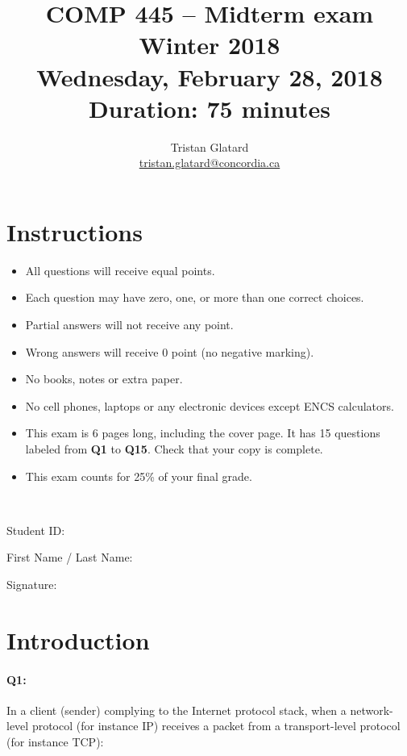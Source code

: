 \documentclass{llncs}
\title{COMP 445 -- Midterm exam \\ Winter 2018 \\ Wednesday, February 28, 2018\\ Duration: 75 minutes}
\author{Tristan Glatard\\
  \href{mailto:tristan.glatard@concordia.ca}{tristan.glatard@concordia.ca}
}
\institute{Concordia University\\
  Department of Computer Science and Software Engineering}
\newcommand{\myspace}[0]{\vspace*{0.25cm}}
\begin{document}
\maketitle

\section*{Instructions}
\begin{itemize}
\item All questions will receive equal points.
\item Each question may have zero, one, or more than one
  correct choices.
\item Partial answers will not
  receive any point.
\item Wrong answers will receive 0 point (no negative marking).
\item No books, notes or extra paper.
\item No cell phones, laptops or any electronic devices except ENCS calculators.
\item This exam is 6 pages long, including the cover page. It has 15 questions labeled from \textbf{Q1} to \textbf{Q15}. Check that your copy is complete.
\item This exam counts for 25\% of your final grade.
\end{itemize}

\hrulefill\\

\myspace

\myspace

Student ID: \dotfill

\myspace

\myspace

First Name / Last Name: \dotfill

\myspace

\myspace

Signature: \dotfill

\myspace

\myspace

\hrulefill

\newpage

\section{Introduction}

\paragraph{\textbf{Q1:}}
In a client (sender) complying to the Internet protocol stack, when a
network-level protocol (for instance IP) receives a packet from a
transport-level protocol (for instance TCP):
\end{document}
